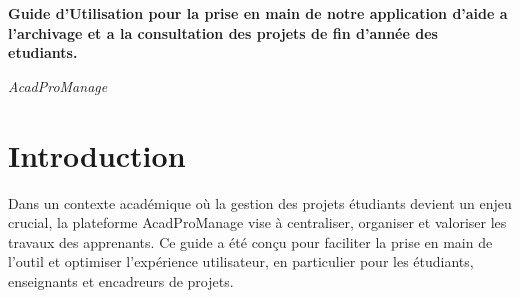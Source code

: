 \documentclass[a4paper,12pt]{article}
\begin{document}
\begin{titlepage}
\centering

\vspace*{4cm}
{\Huge\bfseries Guide d'Utilisation pour la prise en main de notre application d'aide a l'archivage et a la consultation des projets de fin d'année des etudiants.\par}
\vspace{0.5cm}
{\LARGE\itshape AcadProManage \par}
\vspace{2cm}
\vfill


\restoregeometry
\thispagestyle{fancy}
\end{titlepage}
\newpage

\tableofcontents
\newpage


\pagestyle{fancy} %

\fancyhead[L]{}    %
\fancyhead[C]{}                 %
\fancyhead[R]{}         %

\fancyfoot[C]{} %
\fancyfoot[R]{\thepage}                 %
\setlength{\headheight}{15pt} %
\setlength{\footskip}{30pt}




\listoffigures
\vspace{2cm}
\newpage

\section*{Introduction}
Dans un contexte académique où la gestion des projets étudiants devient un enjeu crucial, la plateforme AcadProManage vise à centraliser, organiser et valoriser les travaux des apprenants. Ce guide a été conçu pour faciliter la prise en main de l’outil et optimiser l'expérience utilisateur, en particulier pour les étudiants, enseignants et encadreurs de projets.
\newpage
\end{document}
